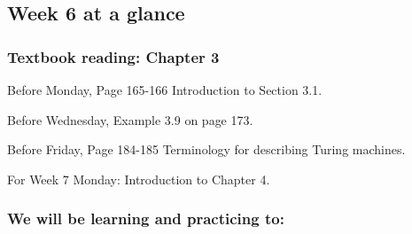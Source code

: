 \documentclass[12pt, oneside]{article}
\begin{document}
\begin{flushright}
\end{flushright} 
\subsection*{Week 6 at a glance}

\vspace{-10pt}

\subsubsection*{Textbook reading: Chapter 3}

\vspace{-10pt}

Before Monday, Page 165-166 Introduction to Section 3.1.

\vspace{-10pt}

Before Wednesday, Example 3.9 on page 173.

\vspace{-10pt}

Before Friday, Page 184-185 Terminology for describing Turing machines.

\vspace{-10pt}

For Week 7 Monday: Introduction to Chapter 4.

\vspace{-20pt}

\subsubsection*{We will be learning and practicing to:}
\vspace{-20pt}
\end{document}
